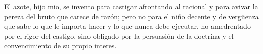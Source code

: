 El azote, hijo mio, se invento para castigar afrontando al racional y para avivar la pereza del
bruto que carece de razón; pero no para el niño decente y de vergüenza que sabe lo que le importa
hacer y lo que nunca debe ejecutar, no amedrentado por el rigor del castigo, sino obligado por
la persuasión de la doctrina y el convencimiento de su propio interes.
